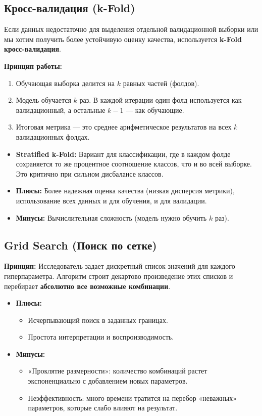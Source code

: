 \documentclass[12pt]{article}
\begin{document}
\subsection{Кросс-валидация (k-Fold)}
Если данных недостаточно для выделения отдельной валидационной выборки или мы хотим получить более устойчивую оценку качества, используется \textbf{k-Fold кросс-валидация}.

\textbf{Принцип работы:}
\begin{enumerate}
    \item Обучающая выборка делится на $k$ равных частей (фолдов).
    \item Модель обучается $k$ раз. В каждой итерации один фолд используется как валидационный, а остальные $k-1$ — как обучающие.
    \item Итоговая метрика — это среднее арифметическое результатов на всех $k$ валидационных фолдах.
\end{enumerate}

\begin{itemize}
    \item \textbf{Stratified k-Fold:} Вариант для классификации, где в каждом фолде сохраняется то же процентное соотношение классов, что и во всей выборке. Это критично при сильном дисбалансе классов.
    \item \textbf{Плюсы:} Более надежная оценка качества (низкая дисперсия метрики), использование всех данных и для обучения, и для валидации.
    \item \textbf{Минусы:} Вычислительная сложность (модель нужно обучить $k$ раз).
\end{itemize}

\subsection{Grid Search (Поиск по сетке)}
\textbf{Принцип:} Исследователь задает дискретный список значений для каждого гиперпараметра. Алгоритм строит декартово произведение этих списков и перебирает \textbf{абсолютно все возможные комбинации}.

\begin{itemize}
    \item \textbf{Плюсы:} 
    \begin{itemize}
        \item Исчерпывающий поиск в заданных границах.
        \item Простота интерпретации и воспроизводимость.
    \end{itemize}
    \item \textbf{Минусы:} 
    \begin{itemize}
        \item «Проклятие размерности»: количество комбинаций растет экспоненциально с добавлением новых параметров.
        \item Неэффективность: много времени тратится на перебор «неважных» параметров, которые слабо влияют на результат.
    \end{itemize}
\end{itemize}
\end{document}
